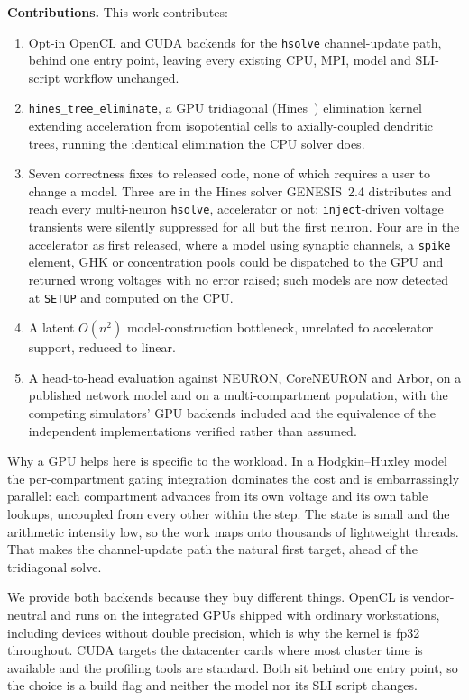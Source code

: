 \documentclass[preprint,12pt, a4paper]{elsarticle}
\newcommand{\hte}{\texttt{hines\_\allowbreak tree\_\allowbreak eliminate}}
\begin{document}
\begin{enumerate}
\textbf{Contributions.} This work contributes:

\begin{enumerate}
\item Opt-in OpenCL and CUDA backends for the \texttt{hsolve} channel-update path, behind one entry point, leaving every existing CPU, MPI, model and SLI-script workflow unchanged.
\item \hte{}, a GPU tridiagonal (Hines~\cite{hines1984efficient}) elimination kernel extending acceleration from isopotential cells to axially-coupled dendritic trees, running the identical elimination the CPU solver does.
\item Seven correctness fixes to released code, none of which requires a user to change a model. Three are in the Hines solver GENESIS~2.4 distributes and reach every multi-neuron \texttt{hsolve}, accelerator or not: \texttt{inject}-driven voltage transients were silently suppressed for all but the first neuron. Four are in the accelerator as first released, where a model using synaptic channels, a \texttt{spike} element, GHK or concentration pools could be dispatched to the GPU and returned wrong voltages with no error raised; such models are now detected at \texttt{SETUP} and computed on the CPU.
\item A latent $O(n^2)$ model-construction bottleneck, unrelated to accelerator support, reduced to linear.
\item A head-to-head evaluation against NEURON, CoreNEURON and Arbor, on a published network model and on a multi-compartment population, with the competing simulators' GPU backends included and the equivalence of the independent implementations verified rather than assumed.
\end{enumerate}

Why a GPU helps here is specific to the workload. In a Hodgkin--Huxley model the per-compartment gating integration dominates the cost and is embarrassingly parallel: each compartment advances from its own voltage and its own table lookups, uncoupled from every other within the step. The state is small and the arithmetic intensity low, so the work maps onto thousands of lightweight threads. That makes the channel-update path the natural first target, ahead of the tridiagonal solve.

We provide both backends because they buy different things. OpenCL is vendor-neutral and runs on the integrated GPUs shipped with ordinary workstations, including devices without double precision, which is why the kernel is fp32 throughout. CUDA targets the datacenter cards where most cluster time is available and the profiling tools are standard. Both sit behind one entry point, so the choice is a build flag and neither the model nor its SLI script changes.


\end{enumerate}
\end{document}
